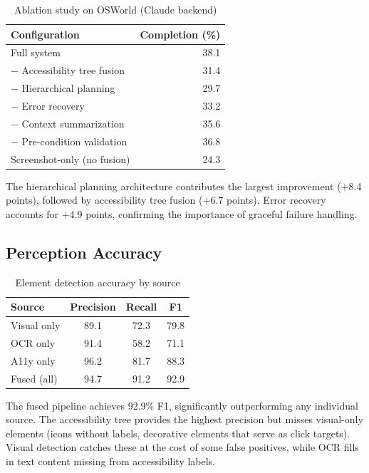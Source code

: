 \documentclass[11pt,twocolumn]{article}
\begin{document}
\begin{table}[t]
\centering
\caption{Ablation study on OSWorld (Claude backend)}
\label{tab:ablation}
\begin{tabular}{@{}lr@{}}
\toprule
\textbf{Configuration} & \textbf{Completion (\%)} \\
\midrule
Full system & 38.1 \\
$-$ Accessibility tree fusion & 31.4 \\
$-$ Hierarchical planning & 29.7 \\
$-$ Error recovery & 33.2 \\
$-$ Context summarization & 35.6 \\
$-$ Pre-condition validation & 36.8 \\
Screenshot-only (no fusion) & 24.3 \\
\bottomrule
\end{tabular}
\end{table}

The hierarchical planning architecture contributes the largest improvement ($+$8.4 points), followed by accessibility tree fusion ($+$6.7 points). Error recovery accounts for $+$4.9 points, confirming the importance of graceful failure handling.

\subsection{Perception Accuracy}

\begin{table}[t]
\centering
\caption{Element detection accuracy by source}
\label{tab:perception}
\begin{tabular}{@{}lccc@{}}
\toprule
\textbf{Source} & \textbf{Precision} & \textbf{Recall} & \textbf{F1} \\
\midrule
Visual only & 89.1 & 72.3 & 79.8 \\
OCR only & 91.4 & 58.2 & 71.1 \\
A11y only & 96.2 & 81.7 & 88.3 \\
Fused (all) & 94.7 & 91.2 & 92.9 \\
\bottomrule
\end{tabular}
\end{table}

The fused pipeline achieves 92.9\% F1, significantly outperforming any individual source. The accessibility tree provides the highest precision but misses visual-only elements (icons without labels, decorative elements that serve as click targets). Visual detection catches these at the cost of some false positives, while OCR fills in text content missing from accessibility labels.
\end{document}
